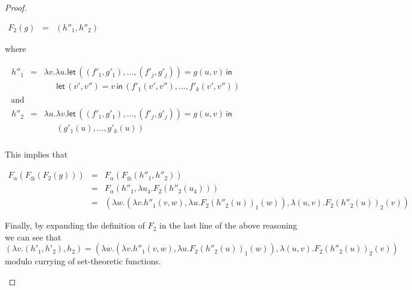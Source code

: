 \documentclass{elsarticle}
\begin{document}
\begin{proof}
\begin{report}
\begin{center}
\begin{itemize}
\begin{center}
\begin{math}
\begin{array}{lll}
            F_2(g) & = & (h''_1,h''_2)
          \end{array}
        \end{math}
      \end{center}
      where
      \begin{center}
        \begin{math}
          \begin{array}{lll}
            \begin{array}{lll}
              h''_1 & = & \lambda v.\lambda u.\mathsf{let}\,((f'_1,g'_1),\ldots,(f'_j,g'_j)) = g(u,v)\,\mathsf{in}\\
              & & \,\,\,\,\,\,\,\,\,\mathsf{let}\,(v',v'') = v\,\mathsf{in}\,(f'_1(v',v''),\ldots,f'_k(v',v''))
              
            \end{array}\\
            \text{ and }\\
            \begin{array}{lll}
              h''_2 & = & \lambda u.\lambda v.\mathsf{let}\,((f'_1,g'_1),\ldots,(f'_j,g'_j)) = g(u,v)\,\mathsf{in}\\
              & & \,\,\,\,\,\,\,\,\,(g'_1(u),\ldots,g'_k(u))\\
            \end{array}
          \end{array}
        \end{math}
      \end{center}
      This implies that
      \begin{center}
        \begin{math}
          \begin{array}{lll}
            F_\alpha(F_\otimes(F_2(g)))
            & = & F_\alpha(F_\otimes(h''_1,h''_2))\\
            & = & F_\alpha(h''_1,\lambda u_4.F_2(h''_2(u_4)))\\
            & = & (\lambda w.(\lambda v.h''_1(v,w),\lambda u.F_2(h''_2(u))_1(w)),\lambda (u,v).F_2(h''_2(u))_2(v))
          \end{array}
        \end{math}
      \end{center}
      Finally, by expanding the definition of $F_2$ in the last line
      of the above reasoning we can see that
      \[ (\lambda v.(h'_1,h'_2),h_2) = (\lambda w.(\lambda v.h''_1(v,w),\lambda u.F_2(h''_2(u))_1(w)),\lambda (u,v).F_2(h''_2(u))_2(v)) \]
      modulo currying of set-theoretic functions.


\end{itemize}
\end{center}
\end{report}
\end{proof}
\end{document}
